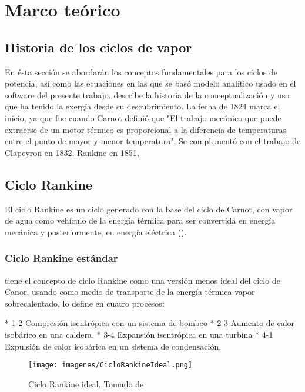 \chapter{Marco teórico}%
\label{cha:Marco teórico}

\section{Historia de los ciclos de vapor}

En ésta sección se abordarán los conceptos fundamentales para los ciclos de potencia, así como las ecuaciones en las que se basó modelo analítico usado en el software del presente trabajo.
\textcite{sciubba2007brief} describe la historia de la conceptualización y uso que ha tenido la exergía desde su descubrimiento. La fecha de 1824 marca el inicio, ya que fue cuando Carnot definió que "El trabajo mecánico que puede extraerse de un motor térmico es proporcional a la diferencia de temperaturas entre el punto de mayor y menor temperatura". Se complementó con el trabajo de Clapeyron en 1832, Rankine en 1851,

\section{Ciclo Rankine}%

El ciclo Rankine es un ciclo generado con la base del ciclo de Carnot, con vapor de agua como vehículo de la energía térmica para ser convertida en energía mecánica y posteriormente, en energía eléctrica (\cite{ccengel2006termodinamica}).

\subsection{Ciclo Rankine estándar}

\textcite{ccengel2006termodinamica} tiene el concepto de ciclo Rankine como una versión menos ideal del ciclo de Canor, usando como medio de transporte de la energía térmica vapor sobrecalentado, lo define en cuatro procesos:

\begin{markdown}
* 1-2 Compresión isentrópica con un sistema de bombeo
* 2-3 Aumento de calor isobárico en una caldera.
* 3-4 Expansión isentrópica en una turbina
* 4-1 Expulsión de calor isobárica en un sistema de condensación.

\end{markdown}

\begin{figure}[H]
    \centering
    \texttt{[image: imagenes/CicloRankineIdeal.png]}
    \caption{Ciclo Rankine ideal. \linebreak Tomado de \force \textcite{ccengel2006termodinamica}}
    \label{fig:imagenes-CicloRankineIdeal-png}
\end{figure}

